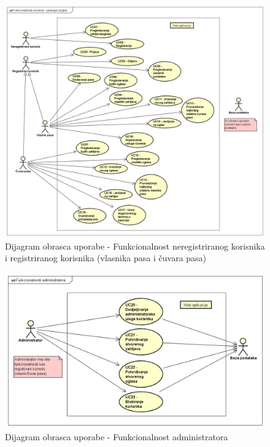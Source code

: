 					\begin{figure}[htb]
						\centering
						\includegraphics[width=14cm]{slike/korisnikExport(new)}
						\caption{Dijagram obrasca uporabe - Funkcionalnost neregistriranog korisnika i registriranog korisnika (vlasnika pasa i čuvara pasa)}
						\label{fig:DOU-korisnici}
					\end{figure}
				\eject		
					\begin{figure}[htb]
						\centering
						\includegraphics[width=14cm]{slike/dijagramExport(new)}
						\caption{Dijagram obrasca uporabe - Funkcionalnost administratora}
						\label{fig:DOU-administrator}
					\end{figure}
				\eject		
				
